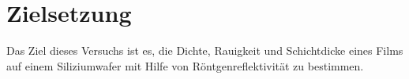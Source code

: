 \section{Zielsetzung}
Das Ziel dieses Versuchs ist es, die Dichte, Rauigkeit und Schichtdicke eines Films auf einem Siliziumwafer mit Hilfe von Röntgenreflektivität zu bestimmen.
